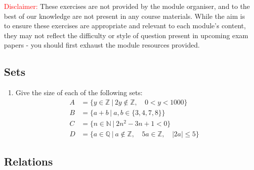 \documentclass[a4paper, 12pt]{article}
\begin{document}
{\small \textcolor{red}{Disclaimer:}
These exercises are not provided by the module organiser, and to the best of our knowledge are not present in any course materials.
While the aim is to ensure these exercises are appropriate and relevant to each module's content, they may not reflect the difficulty or style of question present in upcoming exam papers - you should first exhaust the module resources provided.
}

\subsection*{Sets}

\begin{enumerate}
    
    \item Give the size of each of the following sets:
    \begin{align*} 
        A &= \{ y \in \mathbb{Z} \> | \> 2y \notin \mathbb{Z}, \quad 0 < y < 1000 \} \\
        B &= \{ a + b \> | \> a, b \in \{3, 4, 7, 8\}\} \\
        C &= \{ n \in \mathbb{N} \> | \> 2n^2 - 3n + 1 < 0 \} \\
        D &= \{ a \in \mathbb{Q} \> | \> a \notin \mathbb{Z}, \quad 5a \in \mathbb{Z}, \quad |2a| \leq 5 \}
    \end{align*}

\end{enumerate}

\subsection*{Relations}
\end{document}
